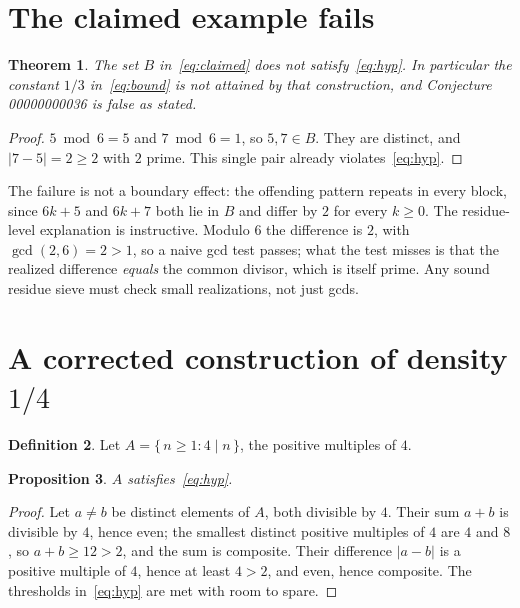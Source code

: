 \documentclass[11pt]{article}
\theoremstyle{plain}
\newtheorem{theorem}{Theorem}
\newtheorem{proposition}[theorem]{Proposition}
\theoremstyle{definition}
\newtheorem{definition}[theorem]{Definition}
\theoremstyle{remark}
\begin{document}
\section{The claimed example fails}

\begin{theorem}\label{thm:refute}
The set $B$ in~\eqref{eq:claimed} does not satisfy~\eqref{eq:hyp}. In
particular the constant $1/3$ in~\eqref{eq:bound} is not attained by that
construction, and Conjecture 00000000036 is false as stated.
\end{theorem}

\begin{proof}
$5\bmod 6 = 5$ and $7\bmod 6 = 1$, so $5,7\in B$. They are distinct, and
$|7-5| = 2\ge2$ with $2$ prime. This single pair already violates~\eqref{eq:hyp}.
\end{proof}

The failure is not a boundary effect: the offending pattern repeats in every
block, since $6k+5$ and $6k+7$ both lie in $B$ and differ by $2$ for every
$k\ge0$. The residue-level explanation is instructive. Modulo $6$ the
difference is $2$, with $\gcd(2,6)=2>1$, so a naive gcd test passes; what the
test misses is that the realized difference \emph{equals} the common divisor,
which is itself prime. Any sound residue sieve must check small realizations,
not just gcds.

\section{A corrected construction of density $1/4$}

\begin{definition}
Let $A=\{\,n\ge1:4\mid n\,\}$, the positive multiples of $4$.
\end{definition}

\begin{proposition}\label{prop:adm}
$A$ satisfies~\eqref{eq:hyp}.
\end{proposition}

\begin{proof}
Let $a\ne b$ be distinct elements of $A$, both divisible by $4$.
Their sum $a+b$ is divisible by $4$, hence even; the smallest distinct
positive multiples of $4$ are $4$ and $8$, so $a+b\ge12>2$, and the sum is
composite. Their difference $|a-b|$ is a positive multiple of $4$, hence at
least $4>2$, and even, hence composite. The thresholds in~\eqref{eq:hyp} are
met with room to spare.
\end{proof}
\end{document}
